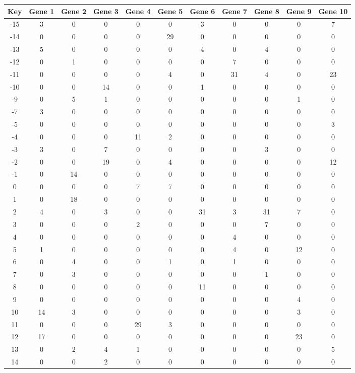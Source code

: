 \begin{tabular}{|c|c|c|c|c|c|c|c|c|c|c|}
\hline
Key & Gene 1 & Gene 2 & Gene 3 & Gene 4 & Gene 5 & Gene 6 & Gene 7 & Gene 8 & Gene 9 & Gene 10 \\
\hline
-15 & 3 & 0 & 0 & 0 & 0 & 3 & 0 & 0 & 0 & 7 \\
-14 & 0 & 0 & 0 & 0 & 29 & 0 & 0 & 0 & 0 & 0 \\
-13 & 5 & 0 & 0 & 0 & 0 & 4 & 0 & 4 & 0 & 0 \\
-12 & 0 & 1 & 0 & 0 & 0 & 0 & 7 & 0 & 0 & 0 \\
-11 & 0 & 0 & 0 & 0 & 4 & 0 & 31 & 4 & 0 & 23 \\
-10 & 0 & 0 & 14 & 0 & 0 & 1 & 0 & 0 & 0 & 0 \\
-9 & 0 & 5 & 1 & 0 & 0 & 0 & 0 & 0 & 1 & 0 \\
-7 & 3 & 0 & 0 & 0 & 0 & 0 & 0 & 0 & 0 & 0 \\
-5 & 0 & 0 & 0 & 0 & 0 & 0 & 0 & 0 & 0 & 3 \\
-4 & 0 & 0 & 0 & 11 & 2 & 0 & 0 & 0 & 0 & 0 \\
-3 & 3 & 0 & 7 & 0 & 0 & 0 & 0 & 3 & 0 & 0 \\
-2 & 0 & 0 & 19 & 0 & 4 & 0 & 0 & 0 & 0 & 12 \\
-1 & 0 & 14 & 0 & 0 & 0 & 0 & 0 & 0 & 0 & 0 \\
0 & 0 & 0 & 0 & 7 & 7 & 0 & 0 & 0 & 0 & 0 \\
1 & 0 & 18 & 0 & 0 & 0 & 0 & 0 & 0 & 0 & 0 \\
2 & 4 & 0 & 3 & 0 & 0 & 31 & 3 & 31 & 7 & 0 \\
3 & 0 & 0 & 0 & 2 & 0 & 0 & 0 & 7 & 0 & 0 \\
4 & 0 & 0 & 0 & 0 & 0 & 0 & 4 & 0 & 0 & 0 \\
5 & 1 & 0 & 0 & 0 & 0 & 0 & 4 & 0 & 12 & 0 \\
6 & 0 & 4 & 0 & 0 & 1 & 0 & 1 & 0 & 0 & 0 \\
7 & 0 & 3 & 0 & 0 & 0 & 0 & 0 & 1 & 0 & 0 \\
8 & 0 & 0 & 0 & 0 & 0 & 11 & 0 & 0 & 0 & 0 \\
9 & 0 & 0 & 0 & 0 & 0 & 0 & 0 & 0 & 4 & 0 \\
10 & 14 & 3 & 0 & 0 & 0 & 0 & 0 & 0 & 3 & 0 \\
11 & 0 & 0 & 0 & 29 & 3 & 0 & 0 & 0 & 0 & 0 \\
12 & 17 & 0 & 0 & 0 & 0 & 0 & 0 & 0 & 23 & 0 \\
13 & 0 & 2 & 4 & 1 & 0 & 0 & 0 & 0 & 0 & 5 \\
14 & 0 & 0 & 2 & 0 & 0 & 0 & 0 & 0 & 0 & 0 \\
\hline
\end{tabular}